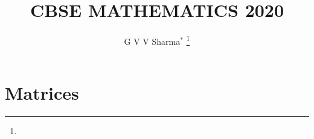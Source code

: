 \documentclass[journal,12pt,twocolumn]{IEEEtran}
\begin{document}
\makeatother
\let\StandardTheFigure\thefigure
\let\vec\mathbf
\renewcommand{\thefigure}{\theproblem}
\def\putbox#1#2#3{\makebox[0in][l]{\makebox[#1][l]{}\raisebox{\baselineskip}[0in][0in]{\raisebox{#2}[0in][0in]{#3}}}}
     \def\rightbox#1{\makebox[0in][r]{#1}}
     \def\centbox#1{\makebox[0in]{#1}}
     \def\topbox#1{\raisebox{-\baselineskip}[0in][0in]{#1}}
     \def\midbox#1{\raisebox{-0.5\baselineskip}[0in][0in]{#1}}
\vspace{3cm}
\title{CBSE MATHEMATICS 2020}
\author{G V V Sharma$^{*}$
	\thanks{}
}
\maketitle
\newpage
\bigskip
\renewcommand{\thefigure}{\theenumi}
\renewcommand{\thetable}{\theenumi}
\renewcommand{\theequation}{\theenumi}
\section{Matrices}
\end{document}
